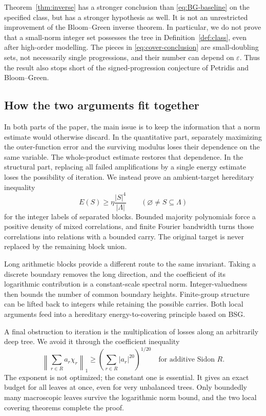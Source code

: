 \documentclass[11pt,reqno]{amsart}
\numberwithin{equation}{section}
\theoremstyle{definition}
\theoremstyle{remark}
\newcommand{\eps}{\varepsilon}
\begin{document}
Theorem~\ref{thm:inverse} has a stronger conclusion than
\eqref{eq:BG-baseline} on the specified class, but has a stronger
hypothesis as well. It is not an unrestricted improvement of the
Bloom--Green inverse theorem. In particular, we do not prove that a
small-norm integer set possesses the tree in Definition~\ref{def:class},
even after high-order modelling. The pieces in \eqref{eq:cover-conclusion}
are small-doubling sets, not necessarily single progressions, and their
number can depend on $\eps$. Thus the result also stops short of the
signed-progression conjecture of Petridis and Bloom--Green.

\subsection{How the two arguments fit together}

In both parts of the paper, the main issue is to keep the information
that a norm estimate would otherwise discard. In the quantitative part,
separately maximizing the outer-function error and the surviving modulus
loses their dependence on the same variable. The whole-product estimate
restores that dependence. In the structural part, replacing all failed
amplifications by a single energy estimate loses the possibility of
iteration. We instead prove an ambient-target hereditary inequality
\begin{equation}\label{eq:hereditary-intro}
 E(S)\ge\eta\frac{|S|^4}{|\Lambda|}
 \qquad(\varnothing\ne S\subseteq\Lambda)
\end{equation}
for the integer labels of separated blocks. Bounded majority polynomials
force a positive density of mixed correlations, and finite Fourier
bandwidth turns those correlations into relations with a bounded carry.
The original target is never replaced by the remaining block union.

Long arithmetic blocks provide a different route to the same invariant.
Taking a discrete boundary removes the long direction, and the coefficient
of its logarithmic contribution is a constant-scale spectral norm.
Integer-valuedness then bounds the number of common boundary heights.
Finite-group structure can be lifted back to integers while retaining
the possible carries. Both local arguments feed into a hereditary
energy-to-covering principle based on BSG.

A final obstruction to iteration is the multiplication of losses along
an arbitrarily deep tree. We avoid it through the coefficient inequality
\[
 \left\|\sum_{r\in R}a_r\chi_r\right\|_1
 \ge\left(\sum_{r\in R}|a_r|^{20}\right)^{1/20}
 \quad\text{for additive Sidon }R.
\]
The exponent is not optimized; the constant one is essential. It gives
an exact budget for all leaves at once, even for very unbalanced trees.
Only boundedly many macroscopic leaves survive the logarithmic norm
bound, and the two local covering theorems complete the proof.
\end{document}
